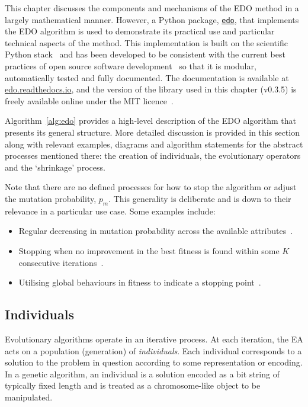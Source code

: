 This chapter discusses the components and mechanisms of the EDO method in a
largely mathematical manner. However, a Python package,
\href{https://github.com/daffidwilde/edo}{\texttt{edo}}, that
implements the EDO algorithm is used to demonstrate its practical use and
particular technical aspects of the method. This implementation is built on the
scientific Python stack~\cite{pandas,numpy} and has been developed to be
consistent with the current best practices of open source software
development~\cite{Jimenez2017} so that it is modular, automatically tested and
fully documented. The documentation is available at \url{edo.readthedocs.io},
and the version of the library used in this chapter (v0.3.5) is freely available
online under the MIT licence~\cite{edo-project}.

Algorithm~\ref{alg:edo} provides a high-level description of the EDO algorithm
that presents its general structure. More detailed discussion is provided in
this section along with relevant examples, diagrams and algorithm statements for
the abstract processes mentioned there: the creation of individuals, the
evolutionary operators and the `shrinkage' process.


Note that there are no defined processes for how to stop the
algorithm or adjust the mutation probability, \(p_m\). This generality is
deliberate and is down to their relevance in a particular use case. Some
examples include:
\begin{itemize}
    \item Regular decreasing in mutation probability across the available
        attributes~\cite{Kuehn2013}.
    \item Stopping when no improvement in the best fitness is found within some
        \(K\) consecutive iterations~\cite{Leung2001}.
    \item Utilising global behaviours in fitness to indicate a stopping
        point~\cite{Marti2016}.
\end{itemize}


\subsection{Individuals}

Evolutionary algorithms operate in an iterative process. At each iteration, the
EA acts on a population (generation) of \emph{individuals}. Each individual
corresponds to a solution to the problem in question according to some
representation or encoding. In a genetic algorithm, an individual is a solution
encoded as a bit string of typically fixed length and is treated as a
chromosome-like object to be manipulated.

